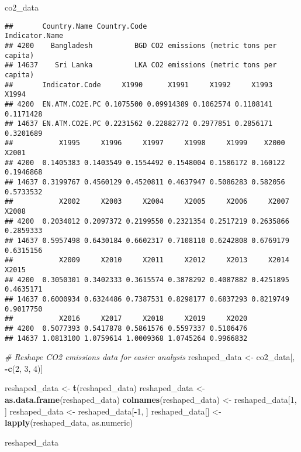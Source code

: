 \documentclass[
]{article}
\newenvironment{Shaded}{\begin{snugshade}}{\end{snugshade}}
\newcommand{\CommentTok}[1]{\textcolor[rgb]{0.56,0.35,0.01}{\textit{#1}}}
\newcommand{\DecValTok}[1]{\textcolor[rgb]{0.00,0.00,0.81}{#1}}
\newcommand{\FunctionTok}[1]{\textcolor[rgb]{0.13,0.29,0.53}{\textbf{#1}}}
\newcommand{\NormalTok}[1]{#1}
\newcommand{\OtherTok}[1]{\textcolor[rgb]{0.56,0.35,0.01}{#1}}
\newcommand{\SpecialCharTok}[1]{\textcolor[rgb]{0.81,0.36,0.00}{\textbf{#1}}}
\begin{document}
\begin{Shaded}
\begin{Highlighting}[]
\NormalTok{co2\_data}
\end{Highlighting}
\end{Shaded}

\begin{verbatim}
##       Country.Name Country.Code                         Indicator.Name
## 4200    Bangladesh          BGD CO2 emissions (metric tons per capita)
## 14637    Sri Lanka          LKA CO2 emissions (metric tons per capita)
##       Indicator.Code     X1990      X1991     X1992     X1993     X1994
## 4200  EN.ATM.CO2E.PC 0.1075500 0.09914389 0.1062574 0.1108141 0.1171428
## 14637 EN.ATM.CO2E.PC 0.2231562 0.22882772 0.2977851 0.2856171 0.3201689
##           X1995     X1996     X1997     X1998     X1999    X2000     X2001
## 4200  0.1405383 0.1403549 0.1554492 0.1548004 0.1586172 0.160122 0.1946868
## 14637 0.3199767 0.4560129 0.4520811 0.4637947 0.5086283 0.582056 0.5733532
##           X2002     X2003     X2004     X2005     X2006     X2007     X2008
## 4200  0.2034012 0.2097372 0.2199550 0.2321354 0.2517219 0.2635866 0.2859333
## 14637 0.5957498 0.6430184 0.6602317 0.7108110 0.6242808 0.6769179 0.6315156
##           X2009     X2010     X2011     X2012     X2013     X2014     X2015
## 4200  0.3050301 0.3402333 0.3615574 0.3878292 0.4087882 0.4251895 0.4635171
## 14637 0.6000934 0.6324486 0.7387531 0.8298177 0.6837293 0.8219749 0.9017750
##           X2016     X2017     X2018     X2019     X2020
## 4200  0.5077393 0.5417878 0.5861576 0.5597337 0.5106476
## 14637 1.0813100 1.0759614 1.0009368 1.0745264 0.9966832
\end{verbatim}

\begin{Shaded}
\begin{Highlighting}[]
\CommentTok{\# Reshape CO2 emissions data for easier analysis}
\NormalTok{reshaped\_data }\OtherTok{\textless{}{-}}\NormalTok{ co2\_data[, }\SpecialCharTok{{-}}\FunctionTok{c}\NormalTok{(}\DecValTok{2}\NormalTok{, }\DecValTok{3}\NormalTok{, }\DecValTok{4}\NormalTok{)]}

\NormalTok{reshaped\_data }\OtherTok{\textless{}{-}} \FunctionTok{t}\NormalTok{(reshaped\_data)}
\NormalTok{reshaped\_data }\OtherTok{\textless{}{-}} \FunctionTok{as.data.frame}\NormalTok{(reshaped\_data)}
\FunctionTok{colnames}\NormalTok{(reshaped\_data) }\OtherTok{\textless{}{-}}\NormalTok{ reshaped\_data[}\DecValTok{1}\NormalTok{, ]}
\NormalTok{reshaped\_data }\OtherTok{\textless{}{-}}\NormalTok{ reshaped\_data[}\SpecialCharTok{{-}}\DecValTok{1}\NormalTok{, ]}
\NormalTok{reshaped\_data[] }\OtherTok{\textless{}{-}} \FunctionTok{lapply}\NormalTok{(reshaped\_data, as.numeric)}

\NormalTok{reshaped\_data}
\end{Highlighting}
\end{Shaded}
\end{document}
